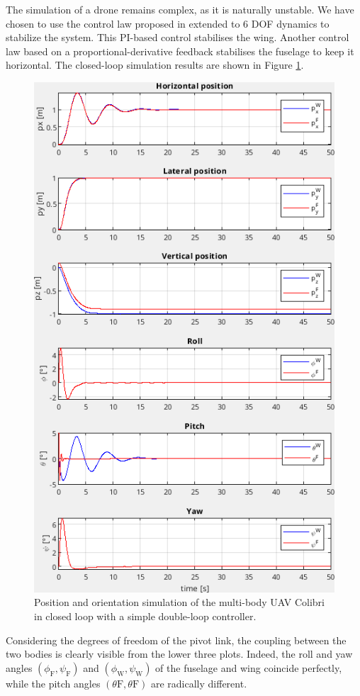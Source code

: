 The simulation of a drone remains complex, as it is naturally unstable. We have chosen to use the control law proposed in \cite{SANSOUACA} extended to 6 DOF dynamics to stabilize the system. This PI-based control stabilises the wing. Another control law based on a proportional-derivative feedback stabilises the fuselage to keep it horizontal. The closed-loop simulation results are shown in Figure \ref{fig:sim_colibri}.
\begin{figure}[!h]
\centering
    \includegraphics[width=1\columnwidth,angle=0]{figures/colibri_sim.png}
    \caption{Position and orientation simulation of the multi-body UAV Colibri in closed loop with a simple double-loop controller. }
    \label{fig:sim_colibri}
\end{figure}
Considering the degrees of freedom of the pivot link, the coupling between the two bodies is clearly visible from the lower three plots. Indeed, the roll and yaw angles $(\phi_{\text{F}}, \psi_{\text{F}})$ and $(\phi_{\text{W}}, \psi_{\text{W}})$ of the fuselage and wing coincide perfectly, while the pitch angles $(\theta{\text{F}}, \theta{\text{F}})$ are radically different.

